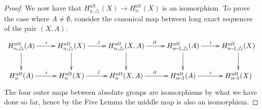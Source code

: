 \documentclass[11pt,a4paper,twoside]{article}
\theoremstyle{plain}
\theoremstyle{definition}
\theoremstyle{definition}
\theoremstyle{definition}
\theoremstyle{definition}
\theoremstyle{definition}
\begin{document}
\begin{proof}
We now have that $H_{n,\triangle}^{alt}(X)\longrightarrow H_n^{alt}(X)$ is an isomorphism. To prove the case where $A\neq\emptyset$, consider the canonical map between long exact sequences of the pair $(X,A)$.
\begin{displaymath}
\xymatrix@C=0.9cm{
    H^{alt}_{n,\triangle}(A) \ar[r]^{i} \ar[d]  &   H^{alt}_{n,\triangle}(X) \ar[r]^j \ar[d]  &   H^{alt}_{n,\triangle}(X,A) \ar[r]^{\partial} \ar[d]   &   H^{alt}_{n\!-\!1,\triangle}(A) \ar[r]^i \ar[d]   &    H^{alt}_{n\!-\!1,\triangle}(X) \ar[d]\\
    H^{alt}_{n}(A) \ar[r]^{i}  &   H^{alt}_{n}(X) \ar[r]^j   &   H^{alt}_{n}(X,A) \ar[r]^{\partial}   &   H^{alt}_{n\!-\!1}(A) \ar[r]^i &  H^{alt}_{n\!-\!1}(X) 
    }
\end{displaymath}
The four outer maps between absolute groups are isomorphisms by what we have done so far, hence by the Five Lemma the middle map is also an isomorphism.
\end{proof}
\end{document}

